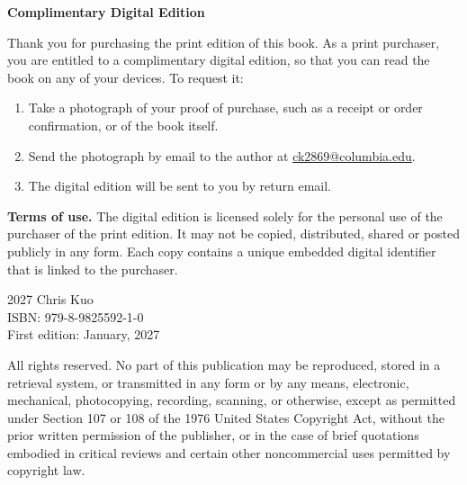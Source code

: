 \documentclass[12pt,twoside,openany]{book}
\newif\ifKDPBleed
\begin{document}
\frontmatter

\ifKDPBleed\else   %

\fi

\clearpage
\begingroup
\footnotesize
\setlength{\parindent}{0pt}
\setlength{\parskip}{0.6\baselineskip}

\begin{tcolorbox}[colback=white, colframe=black!40, boxrule=0.4pt, arc=1pt,
                  left=8pt, right=8pt, top=6pt, bottom=6pt]
\setlength{\parskip}{0.5\baselineskip}
\textbf{Complimentary Digital Edition}

Thank you for purchasing the print edition of this book. As a print purchaser, you are entitled to a complimentary digital edition, so that you can read the book on any of your devices. To request it:
\begin{enumerate}[itemsep=0pt, topsep=2pt, leftmargin=1.5em]
  \item Take a photograph of your proof of purchase, such as a receipt or order confirmation, or of the book itself.
  \item Send the photograph by email to the author at \href{mailto:ck2869@columbia.edu}{ck2869@columbia.edu}.
  \item The digital edition will be sent to you by return email.
\end{enumerate}
\textbf{Terms of use.} The digital edition is licensed solely for the personal use of the purchaser of the print edition. It may not be copied, distributed, shared or posted publicly in any form. Each copy contains a unique embedded digital identifier that is linked to the purchaser.
\end{tcolorbox}

\vspace*{1cm}
\noindent
\textcopyright{} 2027 Chris Kuo \\

\noindent
ISBN: 979-8-9825592-1-0\\
First edition: January, 2027

\vspace{0.5cm}
\noindent All rights reserved. No part of this publication may be reproduced, stored in a retrieval system, or transmitted in any form or by any means, electronic, mechanical, photocopying, recording, scanning, or otherwise, except as permitted under Section 107 or 108 of the 1976 United States Copyright Act, without the prior written permission of the publisher, or in the case of brief quotations embodied in critical reviews and certain other noncommercial uses permitted by copyright law.
\end{document}
